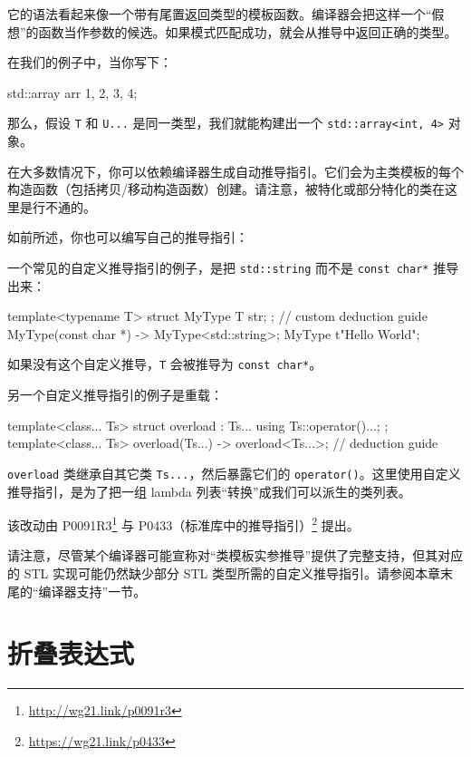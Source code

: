 它的语法看起来像一个带有尾置返回类型的模板函数。编译器会把这样一个“假想”的函数当作参数的候选。如果模式匹配成功，就会从推导中返回正确的类型。

在我们的例子中，当你写下：

\begin{codebox}[cpp]
std::array arr {1, 2, 3, 4};
\end{codebox}

那么，假设 \texttt{T} 和 \texttt{U...} 是同一类型，我们就能构建出一个 \texttt{std::array<int, 4>} 对象。

在大多数情况下，你可以依赖编译器生成自动推导指引。它们会为主类模板的每个构造函数（包括拷贝/移动构造函数）创建。请注意，被特化或部分特化的类在这里是行不通的。

如前所述，你也可以编写自己的推导指引：

一个常见的自定义推导指引的例子，是把 \texttt{std::string} 而不是 \texttt{const char*} 推导出来：

\begin{codebox}[cpp]
template<typename T>
struct MyType
{
T str;
};
// custom deduction guide
MyType(const char *) -> MyType<std::string>;
MyType t{"Hello World"};
\end{codebox}

如果没有这个自定义推导，\texttt{T} 会被推导为 \texttt{const char*}。

另一个自定义推导指引的例子是重载：

\begin{codebox}[cpp]
template<class... Ts>
struct overload : Ts... { using Ts::operator()...; };
template<class... Ts>
overload(Ts...) -> overload<Ts...>; // deduction guide
\end{codebox}

\texttt{overload} 类继承自其它类 \texttt{Ts...}，然后暴露它们的 \texttt{operator()}。这里使用自定义推导指引，是为了把一组 lambda 列表“转换”成我们可以派生的类列表。

\begin{myInfoBox}
该改动由 P0091R3\footnote{\url{http://wg21.link/p0091r3}} 与 P0433（标准库中的推导指引）\footnote{\url{https://wg21.link/p0433}} 提出。

请注意，尽管某个编译器可能宣称对“类模板实参推导”提供了完整支持，但其对应的 STL 实现可能仍然缺少部分 STL 类型所需的自定义推导指引。请参阅本章末尾的“编译器支持”一节。
\end{myInfoBox}

\section{折叠表达式}


